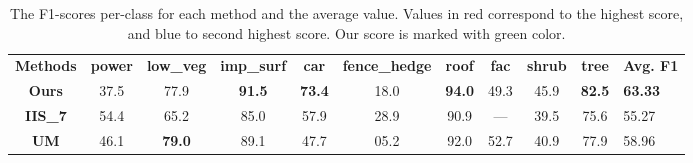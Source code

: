 \documentclass[final,3p,times,twocolumn,authoryear]{elsarticle}
\begin{document}
\begin{table*}[]
\begin{tabular}{c|ccccccccc|l}
\cline{1-11}
\end{tabular}
\end{table*}


\begin{table*}[]
\centering
\caption{The F1-scores per-class for each method and the average value. Values in red correspond to the highest score, and blue to second highest score. Our score is marked with green color.}
\label{tab:F1}
\begin{tabular}{c|ccccccccc|l}
                        \textbf{Methods} & \textbf{power}                        & \textbf{low\_veg}                     & \textbf{imp\_surf}                    & \textbf{car}                          & \textbf{fence\_hedge}                 & \textbf{roof}                         & \textbf{fac}                          & \textbf{shrub}                        & \textbf{tree}                         & \textbf{Avg. F1}                       \\ \cline{1-11} 
\multicolumn{1}{c|}{\textbf{Ours}}   & 37.5                                 & 77.9                                 & {\color[HTML]{FE0000} \textbf{91.5}} & {\color[HTML]{FE0000} \textbf{73.4}} & 18.0                                 & {\color[HTML]{3531FF} \textbf{94.0}} & 49.3                                 & 45.9                                 & {\color[HTML]{3531FF} \textbf{82.5}} & {\color[HTML]{009901} \textbf{63.33}} \\
\multicolumn{1}{c|}{\textbf{IIS\_7}} & 54.4                                 & 65.2                                 & 85.0                                 & 57.9                                 & 28.9                                 & 90.9                                 & ---                                   & 39.5                                 & 75.6                                 & 55.27                                 \\
\multicolumn{1}{c|}{\textbf{UM}}     & 46.1                                 & {\color[HTML]{3531FF} \textbf{79.0}} & 89.1                                 & 47.7                                 & 05.2                                 & 92.0                                 & 52.7                                 & 40.9                                 & 77.9                                 & 58.96                                 \\

\end{tabular}
\end{table*}
\end{document}
